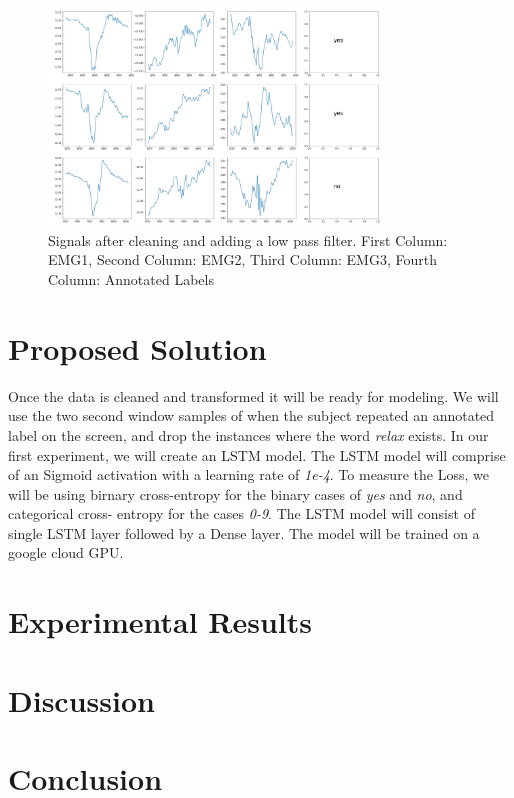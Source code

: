 \documentclass[conference]{IEEEtran}
\begin{document}
\begin{figure}[!t]
\centering
\includegraphics[width=3.5in]{images/cleaned_signals.png}
\caption{Signals after cleaning and adding a low pass filter. First Column: EMG1, Second Column: EMG2, Third Column: EMG3,
Fourth Column: Annotated Labels}
\label{fig: cleaned_signals}
\end{figure}


\section{Proposed Solution}
Once the data is cleaned and transformed it will be ready for modeling. We will use the two second window samples of when the subject repeated an annotated label on the screen, and drop the instances where the word \textit{relax} exists. In our first experiment, we will create an LSTM model. The LSTM model will comprise of an Sigmoid activation with a learning rate of \textit{1e-4}. To measure the Loss, we will be using birnary cross-entropy for the binary cases of \textit{yes} and \textit{no}, and categorical cross- entropy for the cases \textit{0-9}. The LSTM model will consist of single LSTM layer followed by a Dense layer. The model will be trained on a google cloud GPU.

\section{Experimental Results}


\section{Discussion}


\section{Conclusion}
\end{document}
